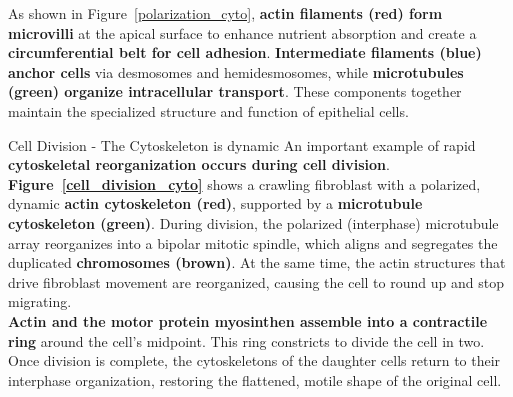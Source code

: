 \documentclass[../main.tex]{subfiles}
\begin{document}
\indent As shown in Figure~\ref{polarization_cyto}, \textbf{actin filaments (red) form microvilli} at the apical surface to enhance nutrient absorption and create a \textbf{circumferential belt for cell adhesion}. \textbf{Intermediate filaments (blue) anchor cells} via desmosomes and hemidesmosomes, while \textbf{microtubules (green) organize intracellular transport}. These components together maintain the specialized structure and function of epithelial cells.

\begin{ExWithTitle}{Cell Division - The Cytoskeleton is dynamic}
	An important example of rapid \textbf{cytoskeletal reorganization occurs during cell division}. \textbf{Figure~\ref{cell_division_cyto}} shows a crawling fibroblast with a polarized, dynamic \textbf{actin cytoskeleton (red)}, supported by a \textbf{microtubule cytoskeleton (green)}. During division, the polarized (interphase) microtubule array reorganizes into a bipolar mitotic spindle, which aligns and segregates the duplicated \textbf{chromosomes (brown)}. At the same time, the actin structures that drive fibroblast movement are reorganized, causing the cell to round up and stop migrating. \\
	\indent \textbf{Actin and the motor protein myosinthen assemble into a contractile ring} around the cell’s midpoint. This ring constricts to divide the cell in two. Once division is complete, the cytoskeletons of the daughter cells return to their interphase organization, restoring the flattened, motile shape of the original cell.
\end{ExWithTitle}
\end{document}
